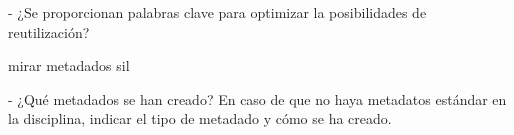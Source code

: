 \documentclass[12pt, spanish]{article}
\begin{document}
- ¿Se proporcionan palabras clave para optimizar la posibilidades de reutilización?

mirar metadados sil

- ¿Qué metadados se han creado? En caso de que no haya metadatos estándar en la disciplina, indicar el tipo de metadado y cómo se ha creado.




































\end{document}

